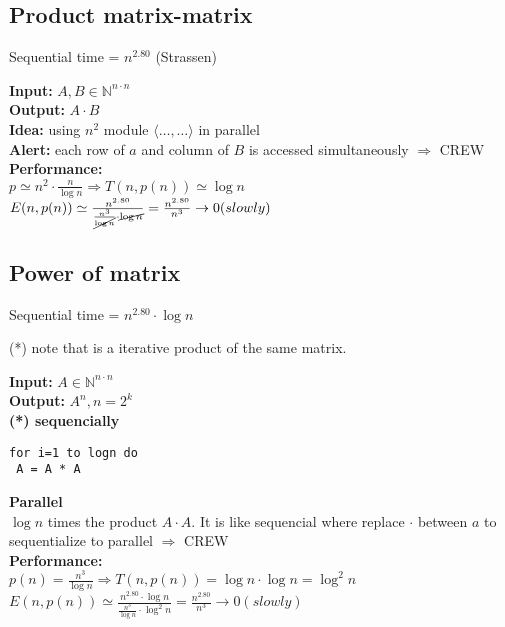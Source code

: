 \subsection{Product matrix-matrix}

Sequential time = $n^{2.80}$ (Strassen)

\textbf{Input:} $A,B \in \mathbb{N}^{n \cdot n}$\\
\textbf{Output:} $A \cdot B$\\
\textbf{Idea:} using $n^2$ module $\langle \dots,\dots \rangle$ in parallel\\
\textbf{Alert:} each row of $a$ and column of $B$ is accessed simultaneously $\Rightarrow$ CREW\\

\textbf{Performance:}\\
$p \simeq n^2 \cdot \frac{n}{\log{n}} \Rightarrow T(n, p(n)) \simeq \log{n}$\\
$E(n,p(n)) \simeq  \frac{n^{2.80}}{\frac{n^3}{\cancel{\log{n}}} \cdot \cancel{\log{n}}} = \frac{n^{2.80}}{n^3} \rightarrow 0 (slowly)$

\subsection{Power of matrix}

Sequential time = $n^{2.80} \cdot \log{n}$

(*) note that is a iterative product of the same matrix.

\textbf{Input:} $A \in \mathbb{N}^{n \cdot n}$\\
\textbf{Output:} $A^n, n = 2^k$\\
\textbf{(*) sequencially}
\begin{lstlisting}[]
for i=1 to logn do
 A = A * A
\end{lstlisting}
\textbf{Parallel}\\
$\log{n}$ times the product $A \cdot A$. It is like sequencial where replace $\cdot$ between $a$ to sequentialize to parallel $\Rightarrow$ CREW\\

\textbf{Performance:}\\
$p(n) = \frac{n^3}{\log{n}} \Rightarrow T(n, p(n)) = \log{n} \cdot \log{n} = \log^2{n}$\\
$E(n,p(n)) \simeq  \frac{n^{2.80} \cdot \log{n}}{\frac{n^3}{\log{n}} \cdot \log^2{n}} = \frac{n^{2.80}}{n^3} \rightarrow 0 (slowly)$